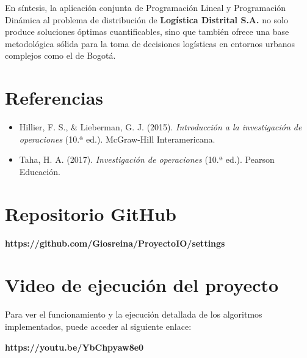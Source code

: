 \documentclass[12pt]{article}
\begin{document}
En síntesis, la aplicación conjunta de Programación Lineal y Programación Dinámica al problema de distribución de \textbf{Logística Distrital S.A.} no solo produce soluciones óptimas cuantificables, sino que también ofrece una base metodológica sólida para la toma de decisiones logísticas en entornos urbanos complejos como el de Bogotá.

\section{Referencias}
\begin{itemize}[label={}, leftmargin=2em, itemindent=-2em, parsep=0.5em]
	\item Hillier, F. S., \& Lieberman, G. J. (2015). \textit{Introducción a la investigación de operaciones} (10.ª ed.). McGraw-Hill Interamericana.
	
	\item Taha, H. A. (2017). \textit{Investigación de operaciones} (10.ª ed.). Pearson Educación.
\end{itemize}
\section{Repositorio GitHub}

\textbf{https://github.com/Giosreina/ProyectoIO/settings}
\section{Video de ejecución del proyecto}
Para ver el funcionamiento y la ejecución detallada de los algoritmos implementados, puede acceder al siguiente enlace:

\textbf{https://youtu.be/YbChpyaw8e0}
\end{document}
